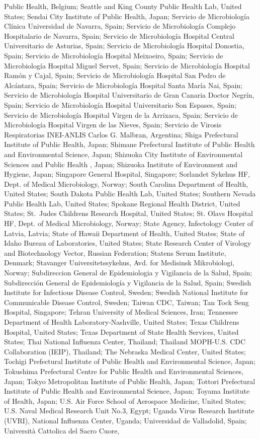 Public Health, Belgium; Seattle and King County Public Health Lab, United States; Sendai City Institute of Public Health, Japan; Servicio de Microbiología Clínica Universidad de Navarra, Spain; Servicio de Microbiología Complejo Hospitalario de Navarra, Spain; Servicio de Microbiología Hospital Central Universitario de Asturias, Spain; Servicio de Microbiología Hospital Donostia, Spain; Servicio de Microbiología Hospital Meixoeiro, Spain; Servicio de Microbiología Hospital Miguel Servet, Spain; Servicio de Microbiología Hospital Ramón y Cajal, Spain; Servicio de Microbiología Hospital San Pedro de Alcántara, Spain; Servicio de Microbiología Hospital Santa María Nai, Spain; Servicio de Microbiología Hospital Universitario de Gran Canaria Doctor Negrín, Spain; Servicio de Microbiología Hospital Universitario Son Espases, Spain; Servicio de Microbiología Hospital Virgen de la Arrixaca, Spain; Servicio de Microbiología Hospital Virgen de las Nieves, Spain; Servicio de Virosis Respiratorias INEI-ANLIS Carlos G. Malbran, Argentina; Shiga Prefectural Institute of Public Health, Japan; Shimane Prefectural Institute of Public Health and Environmental Science, Japan; Shizuoka City Institute of Environmental Sciences and Public Health , Japan; Shizuoka Institute of Environment and Hygiene, Japan; Singapore General Hospital, Singapore; Sorlandet Sykehus HF, Dept. of Medical Microbiology, Norway; South Carolina Department of Health, United States; South Dakota Public Health Lab, United States; Southern Nevada Public Health Lab, United States; Spokane Regional Health District, United States; St.\ Judes Childrens Research Hospital, United States; St. Olavs Hospital HF, Dept. of Medical Microbiology, Norway; State Agency, Infectology Center of Latvia, Latvia; State of Hawaii Department of Health, United States; State of Idaho Bureau of Laboratories, United States; State Research Center of Virology and Biotechnology Vector, Russian Federation; Statens Serum Institute, Denmark; Stavanger Universitetssykehus, Avd. for Medisinsk Mikrobiologi, Norway; Subdireccion General de Epidemiologia y Vigilancia de la Salud, Spain; Subdirección General de Epidemiología y Vigilancia de la Salud, Spain; Swedish Institute for Infectious Disease Control, Sweden; Swedish National Institute for Communicable Disease Control, Sweden; Taiwan CDC, Taiwan; Tan Tock Seng Hospital, Singapore; Tehran University of Medical Sciences, Iran; Tennessee Department of Health Laboratory-Nashville, United States; Texas Childrens Hospital, United States; Texas Department of State Health Services, United States; Thai National Influenza Center, Thailand; Thailand MOPH-U.S. CDC Collaboration (IEIP), Thailand; The Nebraska Medical Center, United States; Tochigi Prefectural Institute of Public Health and Environmental Science, Japan; Tokushima Prefectural Centre for Public Health and Environmental Sciences, Japan; Tokyo Metropolitan Institute of Public Health, Japan; Tottori Prefectural Institute of Public Health and Environmental Science, Japan; Toyama Institute of Health, Japan; U.S. Air Force School of Aerospace Medicine, United States; U.S. Naval Medical Research Unit No.3, Egypt; Uganda Virus Research Institute (UVRI), National Influenza Center, Uganda; Universidad de Valladolid, Spain; Università Cattolica del Sacro Cuore, 